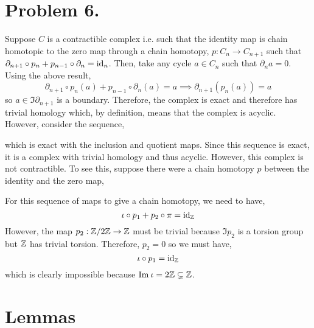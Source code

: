 \documentclass[12pt]{extarticle}
\begin{document}
\section*{Problem 6.}
Suppose $C$ is a contractible complex i.e. such that the identity map is chain homotopic to the zero map through a chain homotopy, $p : C_n \to C_{n+1}$ such that $\partial_{n + 1} \circ p_{n} + p_{n-1} \circ \partial_n = \mathrm{id}_n$. Then, take any cycle $a \in C_n$ such that $\partial_n a = 0$. Using the above result, 
\[ \partial_{n + 1} \circ p_{n}(a) + p_{n-1} \circ \partial_n( a) = a \implies \partial_{n+1} (p_n(a)) = a \]
so $a \in \Im{\partial_{n+1}}$ is a boundary. Therefore, the complex is exact and therefore has trivial homology which, by definition, means that the complex is acyclic.
\bigskip\\
However, consider the sequence,
\begin{center}
\end{center}
which is exact with the inclusion  and quotient maps. Since this sequence is exact, it is a complex with trivial homology and thus acyclic. However, this complex is not contractible. To see this, suppose there were a chain homotopy $p$ between the identity and the zero map,
\begin{center}
\end{center}
For this sequence of maps to give a chain homotopy, we need to have,
\[ \iota \circ p_1 + p_2 \circ \pi = \mathrm{id}_{\mathbb{Z}} \]
However, the map $p_2 : \mathbb{Z} / 2 \mathbb{Z} \to \mathbb{Z}$ must be trivial because $\Im{p_2}$ is a torsion group but $\mathbb{Z}$ has trivial torsion. Therefore, $p_2 = 0$ so we must have,
\[ \iota \circ p_1 = \mathrm{id}_{\mathbb{Z}} \]
which is clearly impossible because $\mathrm{Im} \: \iota = 2 \mathbb{Z} \subsetneq \mathbb{Z}$. 

\section{Lemmas}
\end{document}
